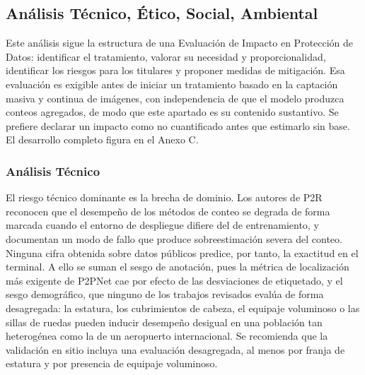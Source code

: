 %
%


\subsection{Análisis Técnico, Ético, Social, Ambiental}
\label{sec:analisis}
\label{sec:eipd}
\label{sec:sintesis-impacto}

Este análisis sigue la estructura de una Evaluación de Impacto en
Protección de Datos: identificar el tratamiento, valorar su necesidad y
proporcionalidad, identificar los riesgos para los titulares y proponer
medidas de mitigación. Esa evaluación es exigible antes de iniciar un
tratamiento basado en la captación masiva y continua de imágenes, con
independencia de que el modelo produzca conteos agregados, de modo que
este apartado es su contenido sustantivo. Se prefiere declarar un
impacto como no cuantificado antes que estimarlo sin base. El desarrollo
completo figura en el Anexo C.

\subsubsection{Análisis Técnico}

El riesgo técnico dominante es la brecha de dominio. Los autores de P2R
\cite{Lin_2025_CVPR} reconocen que el desempeño de los métodos de conteo
se degrada de forma marcada cuando el entorno de despliegue difiere del
de entrenamiento, y documentan un modo de fallo que produce
sobreestimación severa del conteo. Ninguna cifra obtenida sobre datos
públicos predice, por tanto, la exactitud en el terminal. A ello se
suman el sesgo de anotación, pues la métrica de localización más
exigente de P2PNet \cite{Song_2021_ICCV} cae por efecto de las
desviaciones de etiquetado, y el sesgo demográfico, que ninguno de los
trabajos revisados evalúa de forma desagregada: la estatura, los
cubrimientos de cabeza, el equipaje voluminoso o las sillas de ruedas
pueden inducir desempeño desigual en una población tan heterogénea como
la de un aeropuerto internacional. Se recomienda que la validación en
sitio incluya una evaluación desagregada, al menos por franja de
estatura y por presencia de equipaje voluminoso.

